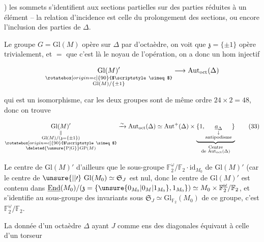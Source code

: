 ) les sommets s'identifient aux sections partielles sur des parties  réduites à un élément -- la relation d'incidence est celle du prolongement des sections, ou encore l'inclusion des parties de $\Delta$.

Le groupe $G=\mathrm{Gl}(M)$ opère sur $\Delta$ par  d'octaèdre, on voit que $\mathfrak z=\{\pm1\}$ opère trivialement,  et $=$ que c'est là le noyau de l'opération, on a donc un hom injectif

\[
\underset{\substack{\rotatebox[origin=c]{90}{$\scriptstyle\simeq$}\\\mathrm{Gl}(M)/\{\pm1\}}}{\mathrm{Gl}(M)'}\longrightarrow\mathrm{Aut}_{\mathrm{oct}}(\Delta)
\]

\reversemarginpar{}\normalmarginpar

qui est un isomorphisme, car les deux groupes sont de  même ordre $24\times2=48$, donc on trouve

\[
\underset{\substack{\|\\\mathrm{Gl}(M)/(\mathfrak z=\{\pm1\})\\\rotatebox[origin=c]{90}{$\scriptstyle\simeq$}\\\deleted{\unsure{\mathrm P|\mathrm G}}\mathrm{GP}(M)}}{\mathrm{Gl}(M)'}
\xrightarrow{\sim}\mathrm{Aut}_{\mathrm{oct}}(\Delta)\simeq\mathrm{Aut}^+(\Delta)\times
\underbrace{\{1,\underset{\substack{\downarrow\\\text{antipodisme}}}{\underline a_\Delta}\}}_{\substack{\text{Centre}\\\text{de }\mathrm{Aut}_{\mathrm{oct}}(\Delta)}}
\tag*{(33)}
\]

Le centre de $\mathrm{Gl}(M)'$   d'ailleurs que le sous-groupe $\mathbb F_2^{\underline\omega}/\mathbb F_2\cdot\mathrm{id}_{M_0}$ de $\mathrm{Gl}(M)'$ (car le centre de $\unsure{\vert|\prime}\ \mathrm{Gl}(M_0)\simeq\mathfrak S_J$ est nul, donc le centre de $\mathrm{Gl}(M)'$ est contenu dans $\underline{\mathrm{End}}(M_0)/(\mathfrak z=\{\unsure{0_{M_0}|0_M|1_{M_0}},1_{M_0}\})\simeq M_0\times\mathbb F_2^{\underline\omega}/\mathbb F_2$, et s'identifie au sous-groupe des invariants sous $\mathfrak S_J\simeq\mathrm{Gl}_{\mathbb F_2}(M_0)$ de ce groupe, c'est $\mathbb F_2^{\underline\omega}/\mathbb F_2$.

La donnée d'un octaèdre $\Delta$ ayant $J$ comme ens des diagonales équivaut à celle d'un torseur
